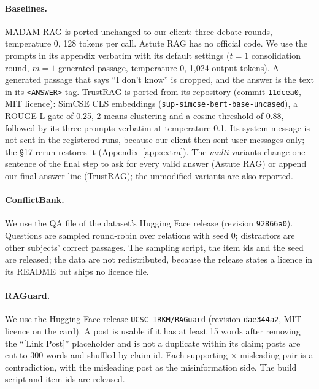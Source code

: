 \paragraph{Baselines.} MADAM-RAG is ported unchanged to our client: three debate rounds, temperature 0, 128 tokens
per call. Astute RAG has no official code. We use the prompts in its appendix verbatim with its default
settings ($t{=}1$ consolidation round, $m{=}1$ generated passage, temperature 0, 1,024 output tokens). A generated
passage that says ``I don't know'' is dropped, and the answer is the text in its \texttt{<ANSWER>} tag. TrustRAG is
ported from its repository (commit \texttt{11dcea0}, MIT licence): SimCSE CLS embeddings
(\texttt{sup-simcse-bert-base-uncased}), a ROUGE-L gate of 0.25, 2-means clustering and a cosine threshold of 0.88,
followed by its three prompts verbatim at temperature 0.1. Its system message is not sent in the registered runs, because our client then sent
user messages only; the \S17 rerun restores it (Appendix~\ref{app:extra}). The \emph{multi} variants change one sentence of the final step to ask for every valid answer
(Astute RAG) or append our final-answer line (TrustRAG); the unmodified variants are also reported.

\paragraph{ConflictBank.} We use the QA file of the dataset's Hugging Face release (revision \texttt{92866a0}). Questions are sampled round-robin over relations with seed 0; distractors are other subjects' correct passages. The
sampling script, the item ids and the seed are released; the data are not redistributed, because the release states
a licence in its README but ships no licence file.

\paragraph{RAGuard.} We use the Hugging Face release \texttt{UCSC-IRKM/RAGuard} (revision \texttt{dae344a2}, MIT
licence on the card). A post is usable if it has at least 15 words after removing the ``[Link Post]'' placeholder and is
not a duplicate within its claim; posts are cut to 300 words and shuffled by claim id. Each supporting $\times$ misleading
pair is a contradiction, with the misleading post as the misinformation side. The build script and item ids are
released.

